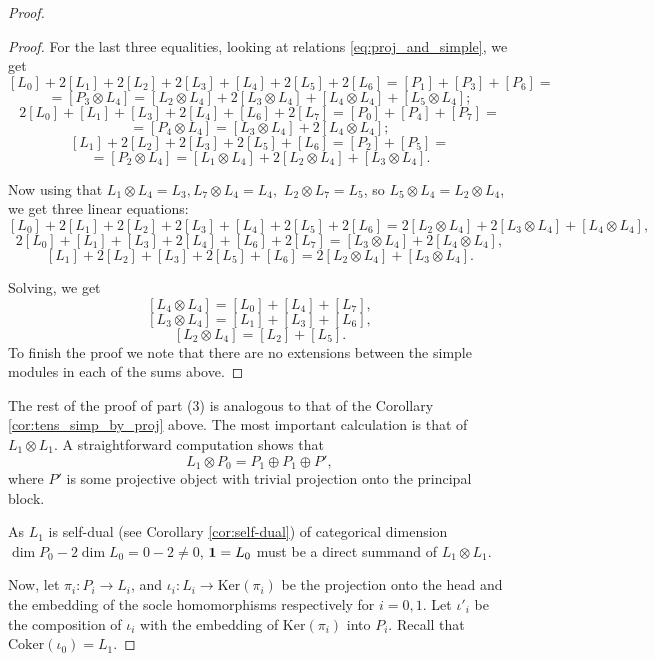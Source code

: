 \documentclass{amsart}
\theoremstyle{definition}
\newcommand{\be}{{\bf 1}}
\numberwithin{equation}{section}
\begin{document}
\begin{proof}
\begin{proof}
        For the last three equalities, looking at relations \ref{eq:proj_and_simple}, we get
        $$
        [L_0]+2[L_1]+2[L_2]+2[L_3]+[L_4]+2[L_5]+2[L_6] = [P_1]+[P_3]+[P_6] =
        $$
        $$
        =[P_3\otimes L_4] = [L_2\otimes L_4] + 2[L_3\otimes L_4] + [L_4\otimes L_4] + [L_5\otimes L_4];
        $$
        $$
        2[L_0] + [L_1] + [L_3]+2[L_4]+[L_6]+2[L_7] = [P_0]+[P_4]+[P_7] = 
        $$
        $$
        = [P_4\otimes L_4] = [L_3\otimes L_4]+2[L_4\otimes L_4];
        $$
        $$
        [L_1]+2[L_2]+2[L_3]+2[L_5]+[L_6]=[P_2]+[P_5] =
        $$
        $$
        =[P_2\otimes L_4] = [L_1\otimes L_4]+2[L_2\otimes L_4]+[L_3\otimes L_4].
        $$
        

        Now using that $L_1\otimes L_4 = L_3, L_7\otimes L_4 = L_4,$  $L_2\otimes L_7=L_5$, so $L_5\otimes L_4= L_2\otimes L_4$, we get three linear equations:
        $$
        [L_0]+2[L_1]+2[L_2]+2[L_3]+[L_4]+2[L_5]+2[L_6]  = 2[L_2\otimes L_4] + 2[L_3\otimes L_4] + [L_4\otimes L_4],
        $$
        $$
        2[L_0] + [L_1] + [L_3]+2[L_4]+[L_6]+2[L_7] = [L_3\otimes L_4]+2[L_4\otimes L_4],
        $$
        $$
        [L_1]+2[L_2]+[L_3]+2[L_5]+[L_6] = 2[L_2\otimes L_4]+[L_3\otimes L_4].
        $$

        Solving, we get
        $$
        [L_4\otimes L_4] = [L_0]+[L_4]+[L_7],
        $$
        $$
        [L_3\otimes L_4] = [L_1] + [L_3]+[L_6],
        $$
        $$
        [L_2\otimes L_4] = [L_2]+[L_5].
        $$
        To finish the proof we note that there are no extensions between the simple modules in each of the sums above.
    \end{proof}
        


    The rest of the proof of part (3) is analogous to that of the Corollary \ref{cor:tens_simp_by_proj} above. The most important calculation is that of $L_1\otimes L_1$. A straightforward computation shows that 
    $$
    L_1\otimes P_0 = P_1\oplus P_1\oplus P',
    $$
    where $P'$ is some projective object with trivial projection onto the principal block. 

    As $L_1$ is self-dual (see Corollary \ref{cor:self-dual}) of categorical dimension $\dim P_0 -2\dim L_0=0-2\neq 0$, $\be=L_0$ must be a direct summand of $L_1\otimes L_1$. 
    
   
    Now, let $\pi_i:P_i\to L_i$, and $\iota_i: L_i\to \mathrm{Ker}(\pi_i)$ be the projection onto the head and the embedding of the socle homomorphisms respectively for $i=0,1$. Let $\iota'_i$ be the composition of $\iota_i$ with the embedding of $\mathrm{Ker}(\pi_i)$ into $P_i$. Recall that $\mathrm{Coker}( \iota_0) = L_1$.
    

\end{proof}
\end{document}
